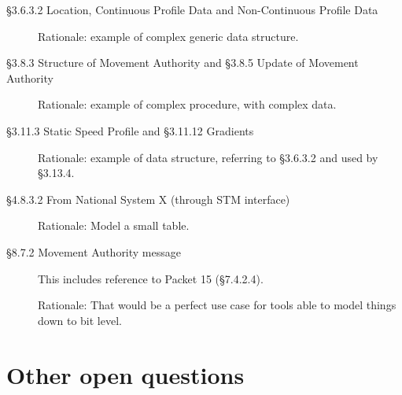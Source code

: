 \documentclass{template/openetcs_article}
\begin{document}
\begin{description}
\item [§3.6.3.2 Location, Continuous Profile Data and Non-Continuous
  Profile Data]

  Rationale: example of complex generic data structure.

\item [§3.8.3 Structure of Movement Authority and §3.8.5 Update of
  Movement Authority]

  Rationale: example of complex procedure, with complex data.

\item [§3.11.3 Static Speed Profile and §3.11.12 Gradients]

  Rationale: example of data structure, referring to §3.6.3.2 and used
  by §3.13.4.

\item [§4.8.3.2 From National System X (through STM interface)]

  Rationale: Model a small table. 

\item [§8.7.2 Movement Authority message] This includes reference to
  Packet 15 (§7.4.2.4). 

  Rationale: That would be a perfect use case for tools able to model
  things down to bit level.
\end{description}

\section{Other open questions}


\end{document}
